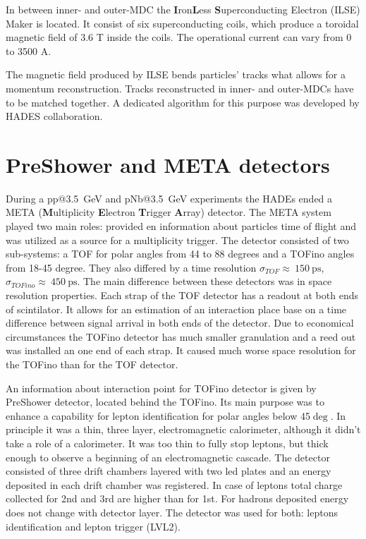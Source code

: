 In between inner- and outer-MDC the \textbf{I}ron\textbf{L}ess \textbf{S}uperconducting Electron (ILSE) Maker is located. It consist of six superconducting coils, which produce a toroidal magnetic field of 3.6 T inside the coils. The operational current can vary from 0 to 3500 A. 

The magnetic field produced by ILSE bends particles' tracks what allows for a momentum reconstruction. Tracks reconstructed in inner- and outer-MDCs have to be matched together. A dedicated algorithm for this purpose was developed by HADES collaboration. 

\section{PreShower and META detectors}
During a pp@3.5~GeV and pNb@3.5~GeV experiments the HADEs ended a META (\textbf{M}ultiplicity \textbf{E}lectron \textbf{T}rigger \textbf{A}rray) detector. The META system played two main roles: provided en information about particles time of flight and was utilized as a source for a multiplicity trigger. The detector consisted of two sub-systems: a TOF for polar angles from 44 to 88 degrees and a TOFino angles from 18-45 degree. They also differed by a time resolution $\sigma_{TOF}\approx~150~\mathrm{ps}$, $\sigma_{TOFino}\approx~450~\mathrm{ps}$. The main difference between these detectors was in space resolution properties. Each strap of the TOF detector has a readout at both ends of scintilator. It allows for an estimation of an interaction place base on a time difference between signal arrival in both ends of the detector. Due to economical circumstances the TOFino detector has much smaller granulation and a reed out was installed an one end of each strap. It caused much worse space resolution for the TOFino than for the TOF detector.

An information about interaction point for TOFino detector is given by PreShower detector, located behind the TOFino. Its main purpose was to enhance a capability for lepton identification for polar angles below 45$\deg$. In principle it was a thin, three layer, electromagnetic calorimeter, although it didn't take a role of a calorimeter. It was too thin to fully stop leptons, but thick enough to observe a beginning of an electromagnetic cascade. The detector consisted of three drift chambers layered with two led plates and an energy deposited in each drift chamber was registered. In case of leptons total charge collected for 2nd and 3rd are higher than for 1st. For hadrons deposited energy does not change with detector layer. The detector was used for both: leptons identification and lepton trigger (LVL2).

